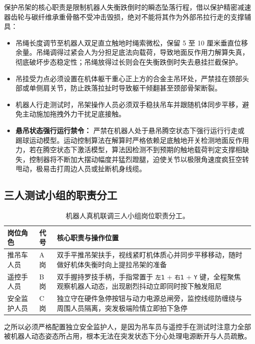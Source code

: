 保护吊架的核心职责是限制机器人失衡跌倒时的瞬态坠落行程，借以保护精密减速器齿轮与碳纤维承重骨骼不受冲击毁损，绝对不能将其作为外部吊拉行走的支撑辅具：

\begin{itemize}[leftmargin=*]
    \item 吊绳长度调节至机器人双足直立触地时绳索微松，保留 5 至 10 厘米垂直位移余量。吊绳调得过紧会人为分担足底法向载荷，导致地面反作用力解算失真，彻底破坏步态稳定性；吊绳放得过长则会在失衡跌倒时失去悬挂拦截保护。
    \item 吊挂受力点必须设置在机体躯干重心正上方的合金主吊环处，严禁挂在颈部头部或单侧肩关节，防止跌落拉扯时导致躯干倾翻甚至颈部骨架断裂。
    \item 机器人行走测试时，吊架操作人员必须双手稳扶吊车并跟随机体同步平移，避免主动施加拖拽外力干扰足底接触。
    \item \textbf{悬吊状态强行运行禁令：} 严禁在机器人处于悬吊腾空状态下强行运行行走或踢球运动模型。运动控制算法在解算时严格依赖足底触地开关检测地面反作用力，若在腾空状态下激活模型，算法因检测不到预期的触地载荷判定支撑相缺失，控制器将不断加大摆动幅度并猛烈蹬腿，迫使关节以极限角速度疯狂空转甩动，极易击打周边人员或扯断机身线缆。
\end{itemize}

\subsection{三人测试小组的职责分工}

\begin{table}[H]
\centering
\small
\begin{tabularx}{\textwidth}{p{2.6cm} p{1.6cm} X}
\toprule
\textbf{岗位角色} & \textbf{代号} & \textbf{核心职责与操作位置} \\
\midrule
推吊车人员 & A 岗 & 双手平推吊架扶手，视线紧盯机体质心并同步平移移动，随时做好机体失衡时向上提拉吊架的准备 \\
\addlinespace
遥控手人员 & B 岗 & 双手握持罗技手柄，手指常置于 \texttt{左1} + \texttt{右1} + \texttt{Y} 键，全程聚焦观察机器人动态，出现剧烈抖动立即同时按下触发阻尼 \\
\addlinespace
安全监护人员 & C 岗 & 独立守在硬件急停按钮与动力电源总闸旁，监控线缆防缠绕与周围人员隔离，突发极端险情立即拍下急停 \\
\bottomrule
\end{tabularx}
\caption{机器人真机联调三人小组岗位职责分工。}
\end{table}

之所以必须严格配置独立安全监护人，是因为吊车员与遥控手在测试时注意力全部被机器人动态姿态所占用，根本无法在突发状态下分心处理电源断开与人员疏散。

